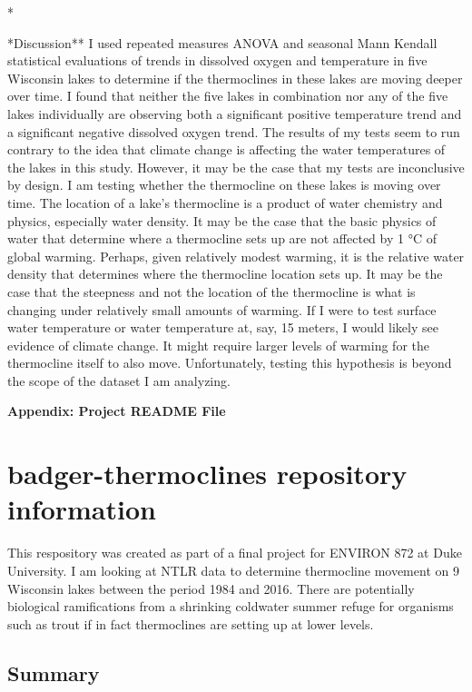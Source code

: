 \documentclass[12pt,]{article}
\begin{document}
\newpage
*

*Discussion** I used repeated measures ANOVA and seasonal Mann Kendall
statistical evaluations of trends in dissolved oxygen and temperature in
five Wisconsin lakes to determine if the thermoclines in these lakes are
moving deeper over time. I found that neither the five lakes in
combination nor any of the five lakes individually are observing both a
significant positive temperature trend and a significant negative
dissolved oxygen trend. The results of my tests seem to run contrary to
the idea that climate change is affecting the water temperatures of the
lakes in this study. However, it may be the case that my tests are
inconclusive by design. I am testing whether the thermocline on these
lakes is moving over time. The location of a lake's thermocline is a
product of water chemistry and physics, especially water density. It may
be the case that the basic physics of water that determine where a
thermocline sets up are not affected by 1 °C of global warming. Perhaps,
given relatively modest warming, it is the relative water density that
determines where the thermocline location sets up. It may be the case
that the steepness and not the location of the thermocline is what is
changing under relatively small amounts of warming. If I were to test
surface water temperature or water temperature at, say, 15 meters, I
would likely see evidence of climate change. It might require larger
levels of warming for the thermocline itself to also move.
Unfortunately, testing this hypothesis is beyond the scope of the
dataset I am analyzing.

\newpage

\textbf{Appendix: Project README File}

\section{badger-thermoclines repository
information}\label{badger-thermoclines-repository-information}

This respository was created as part of a final project for ENVIRON 872
at Duke University. I am looking at NTLR data to determine thermocline
movement on 9 Wisconsin lakes between the period 1984 and 2016. There
are potentially biological ramifications from a shrinking coldwater
summer refuge for organisms such as trout if in fact thermoclines are
setting up at lower levels.

\subsection{Summary}\label{summary}
\end{document}
